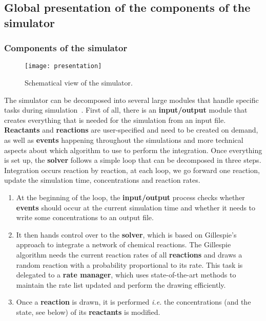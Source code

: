 \graphicspath{{\relativepath/figures/}}

\subsection{Global presentation of the components of the simulator}
\subsubsection{Components of the simulator}

\begin{figure}[!ht]
        \centering
        \texttt{[image: presentation]}
	\caption{Schematical view of the simulator.}
	\label{fig:presentation}
\end{figure}

The simulator can be decomposed into several large modules that handle specific tasks during simulation~. First of all, there is an \textbf{input/output} module that creates everything that is needed for the simulation from an input file. \textbf{Reactants} and \textbf{reactions} are user-specified and need to be created on demand, as well as \textbf{events} happening throughout the simulations and more technical aspects about which algorithm to use to perform the integration. Once everything is set up, the \textbf{solver} follows a simple loop that can be decomposed in three steps. Integration occurs reaction by reaction, at each loop, we go forward one reaction, update the simulation time, concentrations and reaction rates.

\begin{enumerate}
	\item At the beginning of the loop, the \textbf{input/output} process checks whether \textbf{events} should occur at the current simulation time and whether it needs to write some concentrations to an output file.
	\item It then hands control over to the \textbf{solver}, which is based on Gillespie's approach to integrate a network of chemical reactions. The Gillespie algorithm needs the current reaction rates of all \textbf{reactions} and draws a random reaction with a probability proportional to its rate. This task is delegated to a \textbf{rate manager}, which uses state-of-the-art methods to maintain the rate list updated and perform the drawing efficiently.
	\item Once a \textbf{reaction} is drawn, it is performed \textit{i.e.} the concentrations (and the state, see below) of its \textbf{reactants} is modified.
\end{enumerate}











